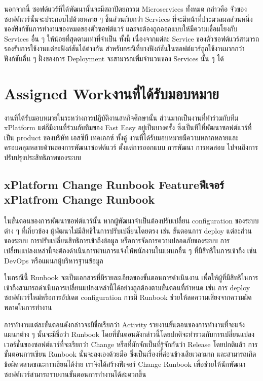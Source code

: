 นอกจากนี้ ซอฟต์แวร์ที่ได้พัฒนานั้นจะมีสถาปัตยกรรม Microservices ทั้งหมด กล่าวคือ จัวของซอฟต์แวร์นั้นจะประกอบไปด้วยหลาย ๆ ชิ้นส่วนเรียกว่า Services ที่จะมีหน้าที่ประมวลผลส่วนหนึ่งของฟังก์ชันการทำงานของหมดของตัวซอฟต์แวร์ และจะต้องถูกออกแบบให้มีความเชื่อมโยงกับ Services อื่น ๆ ให้น้อยที่สุดตามเท่าที่จำเป็น ทั้งนี้ เนื่องจากแต่ละ Service ของตัวซอฟต์แวร์สามารถรองรับการใช้งานแต่ละฟังก์ชันได้ต่างกัน สำหรับกรณีที่บางฟังก์ชันในซอฟต์แวร์ถูกใช้งานมากกว่าฟังก์ชันอื่น ๆ ฝั่งของการ Deployment จะสามารถเพิ่มจำนวนของ Services นั้น ๆ ได้

\section{\ifenglish Assigned Work\else งานที่ได้รับมอบหมาย \fi}
งานที่ได้รับมอบหมายในระหว่างการปฏิบัติงานสหกิจศึกษานั้น ส่วนมากเป็นงานที่ทำร่วมกับทีม xPlatform แต่ก็มีงานที่ร่วมกับทีมของ Fast Easy อยู่เป็นบางครั้ง ซึ่งเป็นทีใที่พัฒนาซอฟต์แวร์ที่เป็น product ของบริษัท เอสซีบี เทคเอกซ์ ทั้งคู่ งานที่ได้รับมอบหมายมีความหลากหลายและครอบคลุมหลายด้านของการพัฒนาซอฟต์แวร์ ตั้งแต่การออกแบบ การพัฒนา การทดสอบ ไปจนถึงการปรับปรุงประสิทธิภาพของระบบ

\subsection{\ifenglish xPlatform Change Runbook​ Feature\else ฟีเจอร์ xPlatfrom Change Runbook\fi}
ในขั้นตอนของการพัฒนาซอฟต์แวร์นั้น หากผู้พัฒนาจำเป็นต้องปรับเปลี่ยน configuration ของระบบต่าง ๆ ที่เกี่ยวข้อง ผู้พัฒนาไม่มีสิทธิในการปรับเปลี่ยนโดยตรง เช่น ขั้นตอนการ deploy แต่ละส่วนของระบบ การปรับเปลี่ยนสิทธิการเข้าถึงข้อมูล หรือการจัดการความปลอดภัยของระบบ การเปลี่ยนแปลงเหล่านี้จะต้องดำเนินการผ่านการแจ้งให้พนักงานในแผนกอื่น ๆ ที่มีสิทธิในการเข้าถึง เช่น DevOps หรือแผนกผู้บริหารฐานข้อมูล

ในกรณีนี้ Runbook จะเป็นเอกสารที่มีรายละเอียดของขั้นตอนการดำเนินงาน เพื่อให้ผู้ที่มีสิทธิในการเข้าถึงสามารถดำเนินการเปลี่ยนแปลงเหล่านี้ได้อย่างถูกต้องตามขั้นตอนที่กำหนด เช่น การ deploy ซอฟต์แวร์ใหม่หรือการอัปเดต configuration การมี Runbook ช่วยให้ลดความเสี่ยงจากความผิดพลาดในการทำงาน

การทำงานแต่ละขั้นตอนดังกล่าวจะมีชื่อเรียกว่า Activity รายงานขั้นตอนของการทำงานที่จะแจ้งแผนกต่าง ๆ นั้นจะมีชื่อว่า Runbook โดยที่ขั้นตอนดังกล่าวนี้โดยปกติจะทำรวมกับการเปลี่ยนแปลงเวอร์ชั่นของซอฟต์แวร์ที่จะเรียกว่า Change หรือที่มักจักเป็นที่รู้จักกันว่า Release โดยปกติแล้ว การขั้นตอนการเขียน Runbook นั้นจะลงเองด้วยมือ ซึ่งเป็นเรื่องที่ค่อนข้างเสียเวลามาก และสามารถเกิดข้อผิดพลาดขณะการเขียนได้ง่าย เราจึงได้สร้างฟีเจอร์ Change Runbook เพื่อช่วยให้นักพัฒนาซอฟต์แวร์สามารถรายงานขั้นตอนการทำงานได้สะดวกขึ้น

